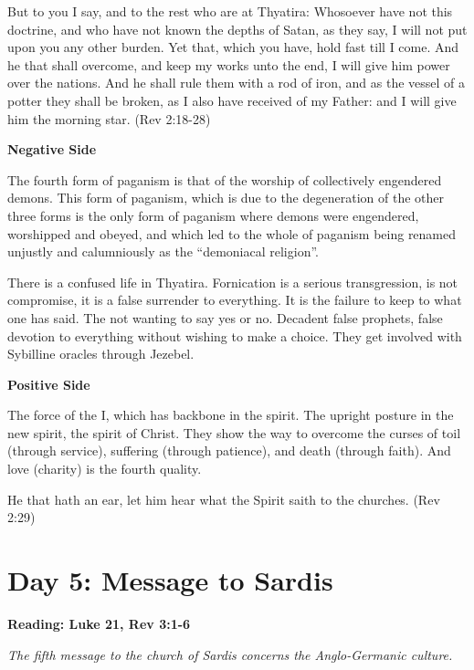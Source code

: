 But to you I say, and to the rest who are at Thyatira: Whosoever have not this doctrine, and who have not known the depths of Satan, as they say, I will not put upon you any other burden. Yet that, which you have, hold fast till I come. And he that shall overcome, and keep my works unto the end, I will give him power over the nations. And he shall rule them with a rod of iron, and as the vessel of a potter they shall be broken, as I also have received of my Father: and I will give him the morning star. (Rev 2:18-28)

\textbf{Negative Side}

\begin{quotex}
The fourth form of paganism is that of the worship of collectively engendered demons. This form of paganism, which is due to the degeneration of the other three forms is the only form of paganism where demons were engendered, worshipped and obeyed, and which led to the whole of paganism being renamed unjustly and calumniously as the ``demoniacal religion''. 

\end{quotex}

There is a confused life in Thyatira. Fornication is a serious transgression, is not compromise, it is a false surrender to everything. It is the failure to keep to what one has said. The not wanting to say yes or no. Decadent false prophets, false devotion to everything without wishing to make a choice. They get involved with Sybilline oracles through Jezebel.

\textbf{Positive Side}

The force of the I, which has backbone in the spirit. The upright posture in the new spirit, the spirit of Christ. They show the way to overcome the curses of toil (through service), suffering (through patience), and death (through faith). And love (charity) is the fourth quality.

He that hath an ear, let him hear what the Spirit saith to the churches. (Rev 2:29)

\section{Day 5: Message to Sardis}

\textbf{Reading: Luke 21, Rev 3:1-6}

\emph{The fifth message to the church of Sardis concerns the Anglo-Germanic culture.}

